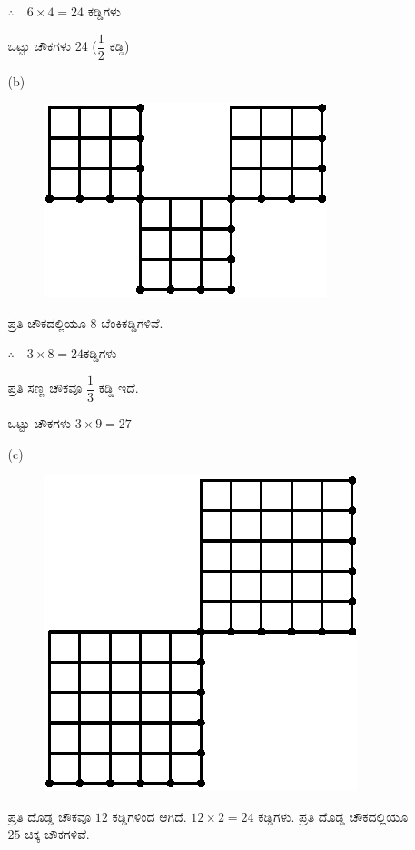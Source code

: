 \begin{enumerate}
\begin{itemize}
\begin{minipage}[c]{4cm}
$\therefore\quad 6\times 4 = 24$ ಕಡ್ಡಿಗಳು 

ಒಟ್ಟು ಚೌಕಗಳು 24 ($\dfrac{1}{2}$ ಕಡ್ಡಿ)
\end{minipage}

\smallskip

\item[(b)]
~

\begin{minipage}[c]{5cm}
\begin{figure}[H]
\centering
\includegraphics[scale=1.1]{images/chap7/ans11b.eps}
\end{figure}
\end{minipage}
\begin{minipage}[c]{4cm}
ಪ್ರತಿ ಚೌಕದಲ್ಲಿಯೂ 8 ಬೆಂಕಿಕಡ್ಡಿಗಳಿವೆ. 

$\therefore\quad 3 \times 8 = 24$ಕಡ್ಡಿಗಳು 

ಪ್ರತಿ ಸಣ್ಣ ಚೌಕವೂ $\dfrac{1}{3}$ ಕಡ್ಡಿ ಇದೆ. 

ಒಟ್ಟು ಚೌಕಗಳು $3 \times 9 = 27$
\end{minipage}

\medskip

\item[(c)] 
~

\begin{minipage}[c]{5cm}
\begin{figure}[H]
\centering
\includegraphics[scale=1.1]{images/chap7/ans11c.eps}
\end{figure}
\end{minipage}
\begin{minipage}[c]{4cm}
ಪ್ರತಿ ದೊಡ್ಡ ಚೌಕವೂ $12$ ಕಡ್ಡಿ\-ಗಳಿಂದ ಆಗಿದೆ. $12 \times 2 = 24$ ಕಡ್ಡಿಗಳು. ಪ್ರತಿ ದೊಡ್ಡ ಚೌಕದಲ್ಲಿಯೂ $25$ ಚಿಕ್ಕ ಚೌಕಗಳಿವೆ. 


\end{minipage}
\end{itemize}
\end{enumerate}
